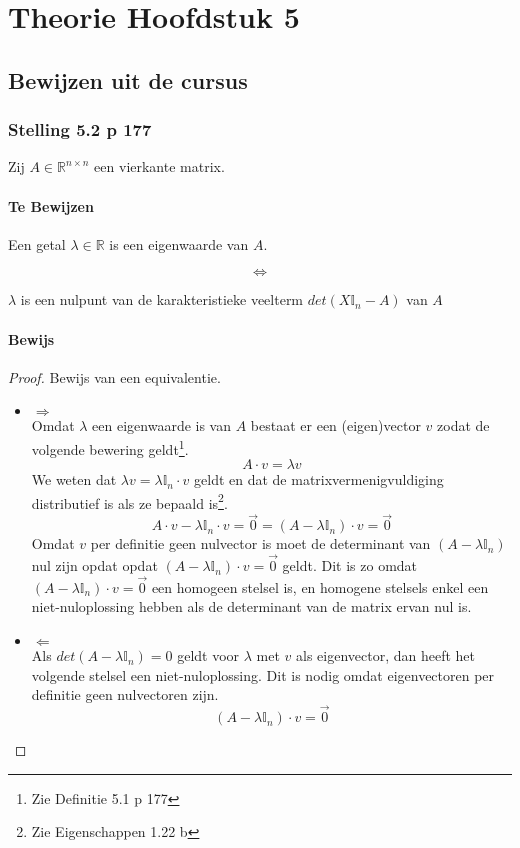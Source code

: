 \documentclass[lineaire_algebra_oplossingen.tex]{subfiles}
\begin{document}
\chapter{Theorie Hoofdstuk 5}
\section{Bewijzen uit de cursus}

\subsection{Stelling 5.2 p 177}
Zij $A\in \mathbb{R}^{n\times n}$ een vierkante matrix.
\subsubsection*{Te Bewijzen}
\begin{center}
Een getal $\lambda\in\mathbb{R}$ is een eigenwaarde van $A$.
\end{center}
\[\Leftrightarrow\]
\begin{center}
$\lambda$ is een nulpunt van de karakteristieke veelterm $det(X\mathbb{I}_n - A)$ van $A$
\end{center}
\subsubsection*{Bewijs}
\begin{proof}
Bewijs van een equivalentie.
\begin{itemize}
\item $\Rightarrow$\\
Omdat $\lambda$ een eigenwaarde is van $A$ bestaat er een (eigen)vector $v$ zodat de volgende bewering geldt\footnote{Zie Definitie 5.1 p 177}.
\[
A\cdot v = \lambda v
\]
We weten dat $\lambda v =  \lambda \mathbb{I}_n \cdot v$ geldt en dat de matrixvermenigvuldiging distributief is als ze bepaald is\footnote{Zie Eigenschappen 1.22 b}.
\[
A\cdot v - \lambda \mathbb{I}_n \cdot v = \vec{0} = (A-\lambda\mathbb{I}_n)\cdot v = \vec{0}
\]
Omdat $v$ per definitie geen nulvector is moet de determinant van $(A-\lambda\mathbb{I}_n)$ nul zijn opdat opdat $(A-\lambda\mathbb{I}_n)\cdot v = \vec{0}$ geldt.
Dit is zo omdat $(A-\lambda\mathbb{I}_n)\cdot v = \vec{0}$ een homogeen stelsel is, en homogene stelsels enkel een niet-nuloplossing hebben als de determinant van de matrix ervan nul is.

\item $\Leftarrow$\\
Als $det(A-\lambda\mathbb{I}_n) = 0$ geldt voor $\lambda$ met $v$ als eigenvector, dan heeft het volgende stelsel een niet-nuloplossing. Dit is nodig omdat eigenvectoren per definitie geen nulvectoren zijn.
\[
(A-\lambda\mathbb{I}_n)\cdot v = \vec{0}
\]
\end{itemize}
\end{proof}
\end{document}
